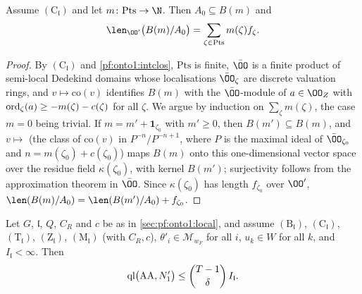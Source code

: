 \begin{lemma}\label{pf:onto1:balls}
Assume $(\mathrm C_{\mathfrak l})$ and let $m\colon\mathrm{Pts}\to\N$. Then $A_0\subseteq B(m)$ and
\[
\len_{\OO'}\bigl(B(m)/A_0\bigr)=\sum_{\zeta\in\mathrm{Pts}}m(\zeta)f_\zeta .
\]
\end{lemma}

\begin{proof}
By $(\mathrm C_{\mathfrak l})$ and \cref{pf:onto1:intclos}, $\mathrm{Pts}$ is finite, $\bar\OO$ is a finite product of semi-local Dedekind
domains whose localisations $\bar\OO_\zeta$ are discrete valuation rings, and $v\mapsto\mathrm{co}(v)$ identifies $B(m)$ with
the $\bar\OO$-module of $a\in\OO_Z$ with $\operatorname{ord}_\zeta(a)\ge-m(\zeta)-c(\zeta)$ for all $\zeta$. We argue by induction on
$\sum_\zeta m(\zeta)$, the case $m=0$ being trivial. If $m=m'+\mathbf 1_{\zeta_0}$ with $m'\ge0$, then $B(m')\subseteq B(m)$, and
$v\mapsto$ (the class of $\mathrm{co}(v)$ in $P^{-n}/P^{-n+1}$, where $P$ is the maximal ideal of $\bar\OO_{\zeta_0}$ and
$n=m(\zeta_0)+c(\zeta_0)$) maps $B(m)$ onto this one-dimensional vector space over the residue field $\kappa(\zeta_0)$, with
kernel $B(m')$; surjectivity follows from the approximation theorem in $\bar\OO$. Since $\kappa(\zeta_0)$ has length
$f_{\zeta_0}$ over $\OO'$, $\len(B(m)/A_0)=\len(B(m')/A_0)+f_{\zeta_0}$.
\end{proof}

\begin{theorem}\label{pf:onto1:lenBase}
Let $G$, $\mathfrak l$, $Q$, $C_R$ and $c$ be as in \cref{sec:pf:onto1:local}, and assume $(\mathrm B_{\mathfrak l})$, $(\mathrm C_{\mathfrak
l})$, $(\mathrm T_{\mathfrak l})$, $(\mathrm Z_{\mathfrak l})$, $(\mathrm M_{\mathfrak l})$ (with $C_R,c$), $\theta'_i\in\mathcal M_{w_F}$ for all
$i$, $u_k\in W$ for all $k$, and $I_{\mathfrak l}<\infty$. Then
\[
\operatorname{ql}\bigl(\mathrm{AA},N_1'\bigr)\le\binom{T-1}{\delta}\,I_{\mathfrak l}.
\]
\end{theorem}

